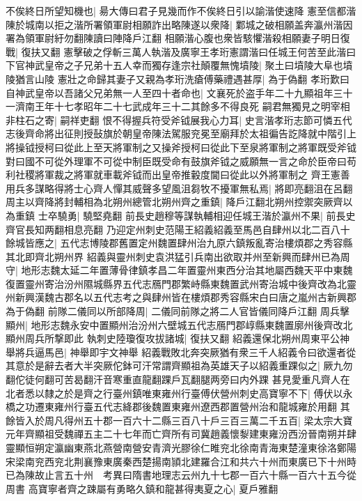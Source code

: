 不俟終日所望知機也|{
	昜大傳曰君子見幾而作不俟終日引以諭湝使速降}
憲至信都湝陳於城南以拒之湝所署領軍尉相願詐出略陳遂以衆降|{
	鄴城之破相願盖奔瀛州湝因署為領軍尉紆勿翻陳讀曰陣降戶江翻}
相願湝心腹也衆皆駭懼湝殺相願妻子明日復戰|{
	復扶又翻}
憲擊破之俘斬三萬人執湝及廣寧王孝珩憲謂湝曰任城王何苦至此湝曰下官神武皇帝之子兄弟十五人幸而獨存逢宗社顛覆無愧墳陵|{
	聚土曰墳陵大阜也墳陵猶言山陵}
憲壯之命歸其妻子又親為孝珩洗瘡傅藥禮遇甚厚|{
	為于偽翻}
孝珩歎曰自神武皇帝以吾諸父兄弟無一人至四十者命也|{
	文襄死於盗手年二十九顯祖年三十一濟南王年十七孝昭年二十七武成年三十二其餘多不得良死}
嗣君無獨見之明宰相非柱石之寄|{
	嗣祥吏翻}
恨不得握兵符受斧钺展我心力耳|{
	史言湝孝珩志節可憐五代志後齊命將出征則授鼔旗於朝皇帝陳法駕服兖冕至廟拜於太祖徧告訖降就中階引上將操钺授柯曰從此上至天將軍制之又操斧授柯曰從此下至泉將軍制之將軍既受斧钺對曰國不可從外理軍不可從中制臣既受命有鼓旗斧钺之威願無一言之命於臣帝曰苟利社稷將軍裁之將軍就車載斧钺而出皇帝推轂度閫曰從此以外將軍制之}
齊王憲善用兵多謀略得將士心齊人憚其威聲多望風沮芻牧不擾軍無私焉|{
	將即亮翻沮在呂翻}
周主以齊降將封輔相為北朔州總管北朔州齊之重鎮|{
	降戶江翻北朔州控禦突厥齊以為重鎮}
士卒驍勇|{
	驍堅堯翻}
前長史趙穆等謀執輔相迎任城王湝於瀛州不果|{
	前長史齊官長知两翻相息亮翻}
乃迎定州刺史范陽王紹義紹義至馬邑自肆州以北二百八十餘城皆應之|{
	五代志博陵郡舊置定州魏置肆州治九原六鎮叛亂寄治樓煩郡之秀容縣其北即齊北朔州界}
紹義與靈州刺史袁洪猛引兵南出欲取并州至新興而肆州已為周守|{
	地形志魏太延二年置薄骨律鎮孝昌二年置靈州東西分治其地屬西魏天平中東魏復置靈州寄治汾州隰城縣界五代志鴈門郡繁峙縣東魏置武州寄治城中後齊改為北靈州新興漢魏古郡名以五代志考之與肆州皆在樓煩郡秀容縣宋白曰唐之嵐州古新興郡為于偽翻}
前隊二儀同以所部降周|{
	二儀同前隊之將二人官皆儀同降戶江翻}
周兵擊顯州|{
	地形志魏永安中置顯州治汾州六壁城五代志鴈門郡崞縣東魏置廓州後齊改北顯州周兵所撃即此}
執刺史陸瓊復攻拔諸城|{
	復扶又翻}
紹義還保北朔州周東平公神舉將兵逼馬邑|{
	神舉即宇文神舉}
紹義戰敗北奔突厥猶有衆三千人紹義令曰欲還者從其意於是辭去者大半突厥佗鉢可汗常謂齊顯祖為英雄天子以紹義重踝似之|{
	厥九勿翻佗徒何翻可苦曷翻汗音寒重直龍翻踝戶瓦翻腿两旁曰内外踝}
甚見愛重凡齊人在北者悉以隸之於是齊之行臺州鎮唯東雍州行臺傅伏營州刺史高寶寧不下|{
	傅伏以永橋之功遷東雍州行臺五代志絳郡後魏置東雍州遼西郡置營州治和龍城雍於用翻}
其餘皆入於周凡得州五十郡一百六十二縣三百八十戶三百三萬二千五百|{
	梁太宗大寶元年齊顯祖受魏禪五主二十七年而亡齊所有司冀趙義懷㴝建東雍汾西汾晉南朔并肆靈顯恒朔定瀛幽東燕北燕營南營安青濟光膠徐仁睢兖北徐南青海東楚潼東徐洛鄭陽宋梁南兖西兖北荆襄豫東廣秦西楚揚南頴北建羅合江和共六十州而東廣已下十州時已為陳故止言五十州　考異曰隋書地理志云州九十七郡一百六十縣一百六十五今從周書}
高寶寧者齊之踈屬有勇略久鎮和龍甚得夷夏之心|{
	夏戶雅翻}
